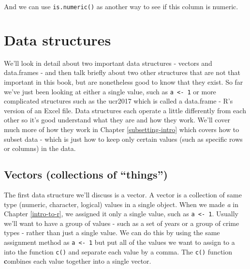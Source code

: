 \documentclass[
]{krantz}
\makeatletter
\newenvironment{Shaded}{\begin{snugshade}}{\end{snugshade}}
\newcommand{\CommentTok}[1]{\textcolor[rgb]{0.37,0.37,0.37}{\textit{#1}}}
\newcommand{\FunctionTok}[1]{\textcolor[rgb]{0,0,0}{#1}}
\newcommand{\NormalTok}[1]{#1}
\newcommand{\SpecialCharTok}[1]{\textcolor[rgb]{0,0,0}{#1}}
\newenvironment{kframe}{%
\medskip{}
\setlength{\fboxsep}{.8em}
 \def\at@end@of@kframe{}%
 \ifinner\ifhmode%
  \def\at@end@of@kframe{\end{minipage}}%
  \begin{minipage}{\columnwidth}%
 \fi\fi%
 \def\FrameCommand##1{\hskip\@totalleftmargin \hskip-\fboxsep
 \colorbox{shadecolor}{##1}\hskip-\fboxsep
     \hskip-\linewidth \hskip-\@totalleftmargin \hskip\columnwidth}%
 \MakeFramed {\advance\hsize-\width
   \@totalleftmargin\z@ \linewidth\hsize
   \@setminipage}}%
 {\par\unskip\endMakeFramed%
 \at@end@of@kframe}
\renewenvironment{Shaded}{\begin{kframe}}{\end{kframe}}
\makeatother
\begin{document}
\begin{Shaded}
\end{Shaded}

And we can use \texttt{is.numeric()} as another way to see if this column is numeric.

\begin{Shaded}
\end{Shaded}

\hypertarget{data-structures}{%
\section{Data structures}\label{data-structures}}

We'll look in detail about two important data structures - vectors and data.frames - and then talk briefly about two other structures that are not that important in this book, but are nonetheless good to know that they exist. So far we've just been looking at either a single value, such as \texttt{a\ \textless{}-\ 1} or more complicated structures such as the ucr2017 which is called a data.frame - R's version of an Excel file. Data structures each operate a little differently from each other so it's good understand what they are and how they work. We'll cover much more of how they work in Chapter \ref{subsetting-intro} which covers how to subset data - which is just how to keep only certain values (such as specific rows or columns) in the data.

\hypertarget{vectors}{%
\subsection{Vectors (collections of ``things'')}\label{vectors}}

The first data structure we'll discuss is a vector. A vector is a collection of same type (numeric, character, logical) values in a single object. When we made \emph{a} in Chapter \ref{intro-to-r}, we assigned it only a single value, such as \texttt{a\ \textless{}-\ 1}. Usually we'll want to have a group of values - such as a set of years or a group of crime types - rather than just a single value. We can do this by using the same assignment method as \texttt{a\ \textless{}-\ 1} but put all of the values we want to assign to a into the function \texttt{c()} and separate each value by a comma. The \texttt{c()} function \textbf{c}ombines each value together into a single vector.
\end{document}
